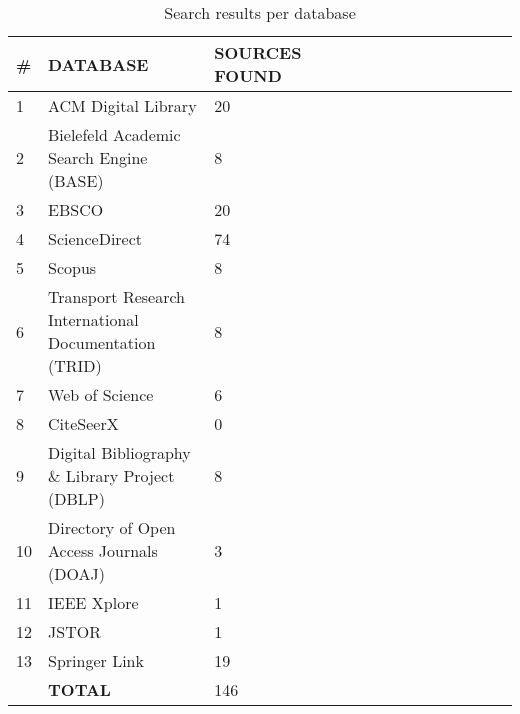 \begin{table*}[h]
\begin{center}
\caption{Search results per database}
\small
\begin{tabular}{*{15}{l}}
\hline
\multicolumn{1}{l}{\#} & \textbf{DATABASE}                                     & \multicolumn{1}{l}{\textbf{SOURCES FOUND}} \\ \hline
1  & ACM Digital Library                      & 20 \\
2  & Bielefeld Academic Search Engine (BASE)  & 8  \\
3  & EBSCO                                    & 20 \\
4  & ScienceDirect                            & 74 \\
5  & Scopus                                   & 8  \\
6                      & Transport Research International Documentation (TRID) & 8                                          \\
7  & Web of Science                           & 6  \\
8  & CiteSeerX                                & 0  \\
9                      & Digital Bibliography \& Library Project (DBLP)        & 8                                          \\
10 & Directory of Open Access Journals (DOAJ) & 3  \\
11 & IEEE Xplore                              & 1  \\
12 & JSTOR                                    & 1  \\
13 & Springer Link                                         & 19                     \\ \hline
   & \textbf{TOTAL}                                        & 146                    \\ \hline
\end{tabular}
\label{table*:results}
\end{center}
\end{table*} 